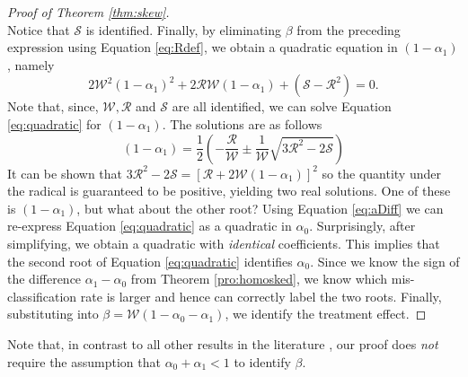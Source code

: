 \begin{proof}[Proof of Theorem \ref{thm:skew}]
\begin{equation}
    \label{eq:Sdef}
  \end{equation}
  Notice that $\mathcal{S}$ is identified.
  Finally, by eliminating $\beta$ from the preceding expression using Equation \ref{eq:Rdef}, we obtain a quadratic equation in $(1-\alpha_1)$, namely 
  \begin{equation}
    2\mathcal{W}^2 (1-\alpha_1)^2 + 2 \mathcal{R}\mathcal{W} (1-\alpha_1) + (\mathcal{S} -\mathcal{R}^2) = 0.
    \label{eq:quadratic}
  \end{equation}
  Note that, since, $\mathcal{W}, \mathcal{R}$ and $\mathcal{S}$ are all identified, we can solve Equation \ref{eq:quadratic} for $(1-\alpha_1)$.
The solutions are as follows
\begin{equation}
  (1 - \alpha_1) = \frac{1}{2} \left( -\frac{\mathcal{R}}{\mathcal{W}} \pm  \frac{1}{\mathcal{W}}\sqrt{3\mathcal{R}^2 - 2 \mathcal{S}}\right)
  \label{eq:quadsolutions}
\end{equation}
It can be shown that $3\mathcal{R}^2 - 2\mathcal{S} = \left[ \mathcal{R} + 2 \mathcal{W}(1-\alpha_1) \right]^2$ so the quantity under the radical is guaranteed to be positive, yielding two real solutions.
One of these is $(1-\alpha_1)$, but what about the other root?
Using Equation \ref{eq:aDiff} we can re-express Equation \ref{eq:quadratic} as a quadratic in $\alpha_0$.
Surprisingly, after simplifying, we obtain a quadratic with \emph{identical} coefficients.
This implies that the second root of Equation \ref{eq:quadratic} identifies $\alpha_0$.
Since we know the sign of the difference $\alpha_1 - \alpha_0$ from Theorem \ref{pro:homosked}, we know which mis-classification rate is larger and hence can correctly label the two roots.
Finally, substituting into $\beta = \mathcal{W}(1-\alpha_0-\alpha_1)$, we identify the treatment effect.
\end{proof}

Note that, in contrast to all other results in the literature \citep{KRS, BBS, FL, Mahajan, Lewbel}, our proof does \emph{not} require the assumption that $\alpha_0 + \alpha_1 <1$ to identify $\beta$.


